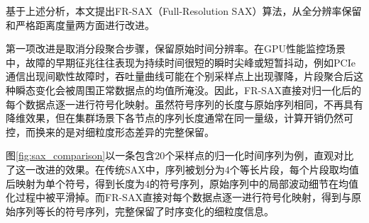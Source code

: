 基于上述分析，本文提出FR-SAX（Full-Resolution SAX）算法，从全分辨率保留和严格距离度量两方面进行改进。

第一项改进是取消分段聚合步骤，保留原始时间分辨率。在GPU性能监控场景中，故障的早期征兆往往表现为持续时间很短的瞬时尖峰或短暂抖动，例如PCIe通信出现间歇性故障时，吞吐量曲线可能在个别采样点上出现骤降，片段聚合后这种瞬态变化会被周围正常数据点的均值所淹没。因此，FR-SAX直接对归一化后的每个数据点逐一进行符号化映射。虽然符号序列的长度与原始序列相同，不再具有降维效果，但在集群场景下各节点的序列长度通常在同一量级，计算开销仍然可控，而换来的是对细粒度形态差异的完整保留。

图\ref{fig:sax_comparison}以一条包含20个采样点的归一化时间序列为例，直观对比了这一改进的效果。在传统SAX中，序列被划分为4个等长片段，每个片段取均值后映射为单个符号，得到长度为4的符号序列，原始序列中的局部波动细节在均值化过程中被平滑掉。而FR-SAX直接对每个数据点逐一进行符号化映射，得到与原始序列等长的符号序列，完整保留了时序变化的细粒度信息。

